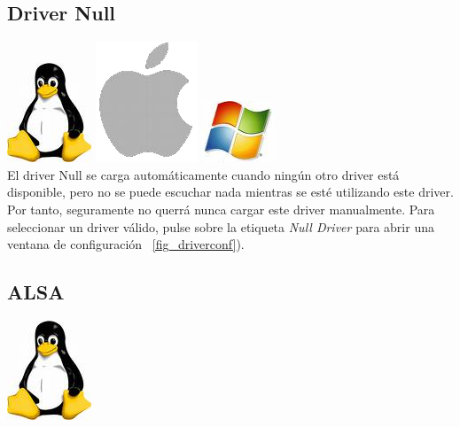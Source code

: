 \subsection{Driver Null}
\includegraphics[height=\baselineskip]{../images/tux.png}
\includegraphics[height=\baselineskip]{../images/mac.png}
\includegraphics[height=\baselineskip]{../images/win.png}
\\
El driver Null se carga automáticamente cuando ningún otro driver está disponible, pero no se puede escuchar nada mientras se esté utilizando este driver. Por tanto, seguramente no querrá nunca cargar este driver manualmente. Para seleccionar un driver válido, pulse sobre la etiqueta \emph{Null Driver} para abrir una ventana de configuración \FigB\ \ref{fig_driverconf}).

\subsection{ALSA}
\includegraphics[height=\baselineskip]{../images/tux.png}
\\

